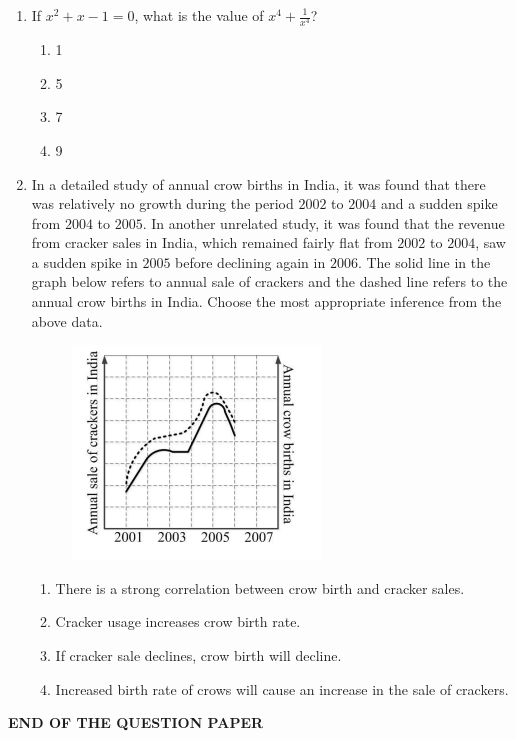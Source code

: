 \documentclass[journal,12pt,onecolumn]{IEEEtran}
\theoremstyle{remark}
\begin{document}
\begin{enumerate}
    \item If $x^2 + x - 1 = 0$, what is the value of $x^4 + \frac{1}{x^4}$?
    \begin{multicols}{4}
    \begin{enumerate}
        \item 1
        \item 5
        \item 7
        \item 9
    \end{enumerate}
    \end{multicols}

    \item In a detailed study of annual crow births in India, it was found that there was relatively no growth during the period $2002$ to $2004$ and a sudden spike from $2004$ to $2005$. In another unrelated study, it was found that the revenue from cracker sales in India, which remained fairly flat from $2002$ to $2004$, saw a sudden spike in $2005$ before declining again in $2006$. The solid line in the graph below refers to annual sale of crackers and the dashed line refers to the annual crow births in India. Choose the most appropriate inference from the above data.

   \begin{figure}[H]
    \centering
    \includegraphics[width = 0.5\columnwidth]{fig/Q10.png}
    \caption*{}
    \label{fig:Q10}
\end{figure}
    
    \begin{enumerate}
        \item There is a strong correlation between crow birth and cracker sales.
        \item Cracker usage increases crow birth rate.
        \item If cracker sale declines, crow birth will decline.
        \item Increased birth rate of crows will cause an increase in the sale of crackers.
    \end{enumerate}
    
\end{enumerate}
{\textbf{END OF THE QUESTION PAPER}}
\newpage
\end{document}
